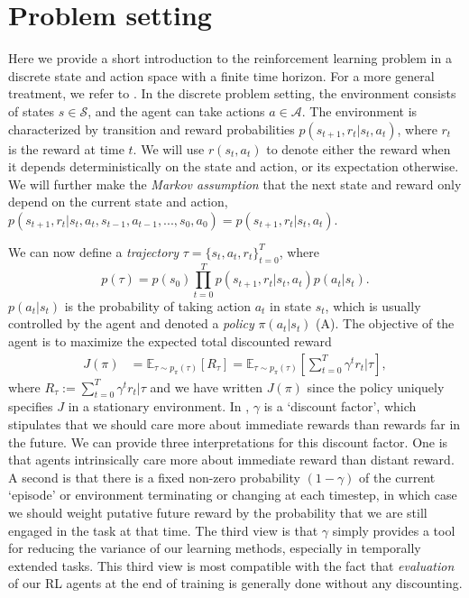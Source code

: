 \section{Problem setting}
\label{sec:problem_setting}

Here we provide a short introduction to the reinforcement learning problem in a discrete state and action space with a finite time horizon.
For a more general treatment, we refer to \citet{sutton2018reinforcement}.
In the discrete problem setting, the environment consists of states $s \in \mathcal{S}$, and the agent can take actions $a \in \mathcal{A}$.
The environment is characterized by transition and reward probabilities $p(s_{t+1}, r_t | s_t, a_t)$, where $r_t$ is the reward at time $t$.
We will use $r(s_t, a_t)$ to denote either the reward when it depends deterministically on the state and action, or its expectation otherwise.
We will further make the \emph{Markov assumption} that the next state and reward only depend on the current state and action, $p(s_{t+1}, r_t | s_t, a_t, s_{t-1}, a_{t-1}, ..., s_0, a_0) = p(s_{t+1}, r_t | s_t, a_t)$.



We can now define a \emph{trajectory} $\tau = \{ s_t, a_t, r_t \}_{t = 0}^T$, where
\begin{equation}
    p(\tau) = p(s_0) \prod_{t = 0}^T p(s_{t+1}, r_t | s_t, a_t) p(a_t|s_t).
\end{equation}
$p(a_t|s_t)$ is the probability of taking action $a_t$ in state $s_t$, which is usually controlled by the agent and denoted a \emph{policy} $\pi(a_t|s_t)$ (A).
The objective of the agent is to maximize the expected total discounted reward
\begin{align}
    \label{eq:RL_objective}
    J(\pi) &= \mathbb{E}_{\tau \sim p_\pi(\tau)} \left [ R_\tau \right ] = \mathbb{E}_{\tau \sim p_\pi(\tau)} \left [ \sum_{t=0}^T \gamma^t r_t | \tau \right ],
\end{align}
where $R_\tau := \sum_{t=0}^T \gamma^t r_t | \tau$ and we have written $J(\pi)$ since the policy uniquely specifies $J$ in a stationary environment.
In , $\gamma$ is a `discount factor', which stipulates that we should care more about immediate rewards than rewards far in the future.
We can provide three interpretations for this discount factor.
One is that agents intrinsically care more about immediate reward than distant reward.
A second is that there is a fixed non-zero probability $(1-\gamma)$ of the current `episode' or environment terminating or changing at each timestep, in which case we should weight putative future reward by the probability that we are still engaged in the task at that time.
The third view is that $\gamma$ simply provides a tool for reducing the variance of our learning methods, especially in temporally extended tasks.
This third view is most compatible with the fact that \emph{evaluation} of our RL agents at the end of training is generally done without any discounting.

